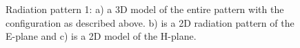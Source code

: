 \begin{figure}[!htb]
\caption{Radiation pattern 1: a) a 3D model of the entire pattern with the configuration as described above. b) is a 2D radiation pattern of the E-plane and c) is a 2D model of the H-plane.}
  \label{radpattern2}
\end{figure}

